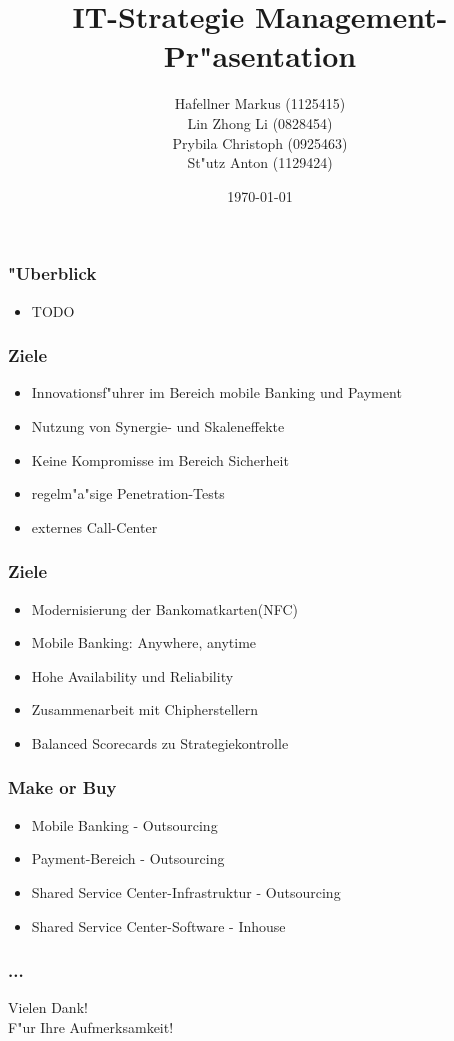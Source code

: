 \documentclass{beamer}
\title{IT-Strategie Management-Pr"asentation}
\author{ Hafellner Markus (1125415)\\
 Lin Zhong Li (0828454)\\
 Prybila Christoph (0925463)\\
 St"utz Anton (1129424)\\
}
\date{\today}
\begin{document}
\maketitle


\begin{frame}

  \frametitle{"Uberblick}
  
  \begin{itemize}

	\item TODO

  \end{itemize}
\end{frame}

\begin{frame}

  \frametitle{Ziele}
  \begin{itemize}

	\item Innovationsf"uhrer im Bereich mobile Banking und Payment
	\item Nutzung von Synergie- und Skaleneffekte
	\item Keine Kompromisse im Bereich Sicherheit
	\item regelm"a"sige Penetration-Tests
	\item externes Call-Center

  \end{itemize}
\end{frame}

\begin{frame}
  \frametitle{Ziele}
  \begin{itemize}

	\item Modernisierung der Bankomatkarten(NFC)
	\item Mobile Banking: Anywhere, anytime
	\item Hohe Availability und Reliability
	\item Zusammenarbeit mit Chipherstellern
	\item Balanced Scorecards zu Strategiekontrolle

  \end{itemize}
\end{frame}

\begin{frame}
  \frametitle{Make or Buy}
  \begin{itemize}

	\item Mobile Banking - Outsourcing
	\item Payment-Bereich - Outsourcing
	\item Shared Service Center-Infrastruktur - Outsourcing
	\item Shared Service Center-Software - Inhouse

  \end{itemize}
\end{frame}

\begin{frame}

  \frametitle{...}
   	Vielen Dank! \\
	F"ur Ihre Aufmerksamkeit!

\end{frame}
\end{document}
